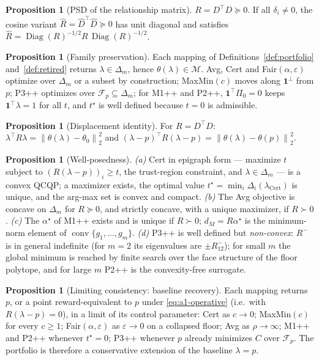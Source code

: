 \documentclass[12pt,a4paper]{report}
\newcommand{\1}{\mathbf{1}}
\newcommand{\norm}[1]{\left\lVert #1 \right\rVert}
\newcommand{\Mfam}{\mathcal{M}}
\newcommand{\Floor}{\mathcal{F}_{p}}
\newcommand{\Pz}{\Pi_{0}}
\DeclareMathOperator{\conv}{conv}
\DeclareMathOperator{\Diag}{Diag}
\theoremstyle{definition}
\newtheorem{proposition}[definition]{Proposition}
\begin{document}
\begin{proposition}[PSD of the relationship matrix]
\label{prop:psd-R}
\(R=D^\top D\succeq0\). If all \(\delta_i\ne0\), the cosine variant \(\hat R=\hat D^\top\hat D\succeq0\) has unit diagonal and satisfies \(\hat R=\Diag(R)^{-1/2}R\,\Diag(R)^{-1/2}\).
\end{proposition}

\begin{proposition}[Family preservation]
\label{prop:family-preservation}
Each mapping of Definitions~\ref{def:portfolio} and~\ref{def:retired} returns \(\lambda\in\Delta_m\), hence \(\theta(\lambda)\in\Mfam\). Avg, Cert and Fair\((\alpha,\varepsilon)\) optimize over \(\Delta_m\) or a subset by construction; MaxMin\((c)\) moves along \(\1^\perp\) from \(p\); P3++ optimizes over \(\Floor\subseteq\Delta_m\); for M1++ and P2++, \(\1^\top\Pz=0\) keeps \(\1^\top\lambda=1\) for all \(t\), and \(t^\star\) is well defined because \(t=0\) is admissible.
\end{proposition}

\begin{proposition}[Displacement identity]
\label{prop:displacement}
For \(R=D^\top D\): \(\lambda^\top R\lambda=\norm{\theta(\lambda)-\theta_0}_2^2\) and \((\lambda-p)^\top R(\lambda-p)=\norm{\theta(\lambda)-\theta(p)}_2^2\).
\end{proposition}

\begin{proposition}[Well-posedness]
\label{prop:well-posedness}
\emph{(a)} Cert in epigraph form --- maximize \(t\) subject to \((R(\lambda-p))_i\ge t\), the trust-region constraint, and \(\lambda\in\Delta_m\) --- is a convex QCQP; a maximizer exists, the optimal value \(t^\star=\min_i\Delta_i(\lambda_{\mathrm{Cert}})\) is unique, and the arg-max set is convex and compact. \emph{(b)} The Avg objective is concave on \(\Delta_m\) for \(R\succeq0\), and strictly concave, with a unique maximizer, if \(R\succ0\). \emph{(c)} The \(\alpha^\star\) of M1++ exists and is unique if \(R\succ0\); \(d_M=R\alpha^\star\) is the minimum-norm element of \(\conv\{g_1,\dots,g_m\}\). \emph{(d)} P3++ is well defined but \emph{non-convex}: \(R^-\) is in general indefinite (for \(m=2\) its eigenvalues are \(\pm R^-_{12}\)); for small \(m\) the global minimum is reached by finite search over the face structure of the floor polytope, and for large \(m\) P2++ is the convexity-free surrogate.
\end{proposition}

\begin{proposition}[Limiting consistency: baseline recovery]
\label{prop:limiting-consistency}
Each mapping returns \(p\), or a point reward-equivalent to \(p\) under \eqref{eq:a1-operative} (i.e.\ with \(R(\lambda-p)=0\)), in a limit of its control parameter: Cert as \(c\to0\); MaxMin\((c)\) for every \(c\ge1\); Fair\((\alpha,\varepsilon)\) as \(\varepsilon\to0\) on a collapsed floor; Avg as \(\rho\to\infty\); M1++ and P2++ whenever \(t^\star=0\); P3++ whenever \(p\) already minimizes \(C\) over \(\Floor\). The portfolio is therefore a conservative extension of the baseline \(\lambda=p\).
\end{proposition}
\end{document}
